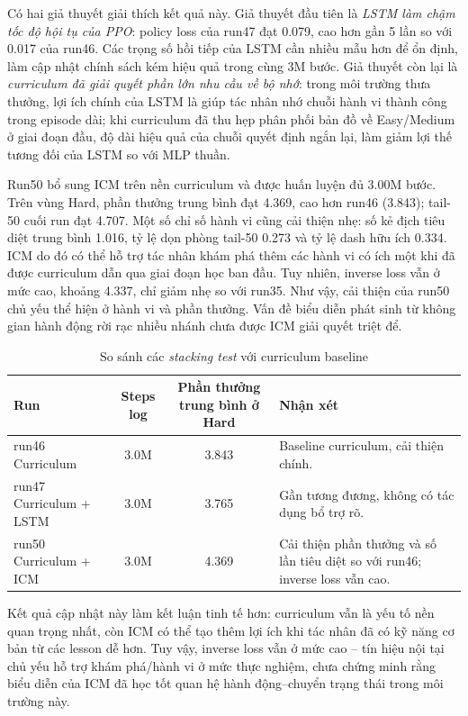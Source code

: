 Có hai giả thuyết giải thích kết quả này. Giả thuyết đầu tiên là \textit{LSTM làm chậm tốc độ hội tụ của PPO}: policy loss của run47 đạt 0.079, cao hơn gần 5 lần so với 0.017 của run46. Các trọng số hồi tiếp của LSTM cần nhiều mẫu hơn để ổn định, làm cập nhật chính sách kém hiệu quả trong cùng 3M bước. Giả thuyết còn lại là \textit{curriculum đã giải quyết phần lớn nhu cầu về bộ nhớ}: trong môi trường thưa thưởng, lợi ích chính của LSTM là giúp tác nhân nhớ chuỗi hành vi thành công trong episode dài; khi curriculum đã thu hẹp phân phối bản đồ về Easy/Medium ở giai đoạn đầu, độ dài hiệu quả của chuỗi quyết định ngắn lại, làm giảm lợi thế tương đối của LSTM so với MLP thuần.

Run50 bổ sung ICM trên nền curriculum và được huấn luyện đủ 3.00M bước. Trên vùng Hard, phần thưởng trung bình đạt 4.369, cao hơn run46 (3.843); tail-50 cuối run đạt 4.707. Một số chỉ số hành vi cũng cải thiện nhẹ: số kẻ địch tiêu diệt trung bình 1.016, tỷ lệ dọn phòng tail-50 0.273 và tỷ lệ dash hữu ích 0.334. ICM do đó có thể hỗ trợ tác nhân khám phá thêm các hành vi có ích một khi đã được curriculum dẫn qua giai đoạn học ban đầu. Tuy nhiên, inverse loss vẫn ở mức cao, khoảng 4.337, chỉ giảm nhẹ so với run35. Như vậy, cải thiện của run50 chủ yếu thể hiện ở hành vi và phần thưởng. Vấn đề biểu diễn phát sinh từ không gian hành động rời rạc nhiều nhánh chưa được ICM giải quyết triệt để.

\begin{table}[H]
    \centering
    \small
    \caption{So sánh các \emph{stacking test} với curriculum baseline}
    \label{tab:stacking_tests}
    \begin{tabular}{|p{4.4cm}|c|c|p{4.8cm}|}
        \hline
        \textbf{Run} & \textbf{Steps log} & \textbf{Phần thưởng trung bình ở Hard} & \textbf{Nhận xét} \\
        \hline
        run46 Curriculum & 3.0M & 3.843 & Baseline curriculum, cải thiện chính. \\
        \hline
        run47 Curriculum + LSTM & 3.0M & 3.765 & Gần tương đương, không có tác dụng bổ trợ rõ. \\
        \hline
        run50 Curriculum + ICM & 3.0M & 4.369 & Cải thiện phần thưởng và số lần tiêu diệt so với run46; inverse loss vẫn cao. \\
        \hline
    \end{tabular}
\end{table}

Kết quả cập nhật này làm kết luận tinh tế hơn: curriculum vẫn là yếu tố nền quan trọng nhất, còn ICM có thể tạo thêm lợi ích khi tác nhân đã có kỹ năng cơ bản từ các lesson dễ hơn. Tuy vậy, inverse loss vẫn ở mức cao -- tín hiệu nội tại chủ yếu hỗ trợ khám phá/hành vi ở mức thực nghiệm, chưa chứng minh rằng biểu diễn của ICM đã học tốt quan hệ hành động--chuyển trạng thái trong môi trường này.

